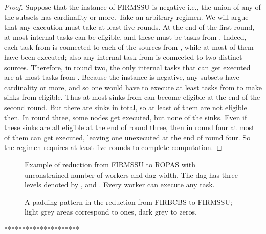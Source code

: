 \documentclass[letterpaper,11pt]{article}
\newcommand{\FFF}{\vspace*{\bigskipamount}}
\begin{document}
{\begin{proof}
Suppose that the instance of FIRMSSU is negative i.e., the union of any  of the subsets has cardinality  or more. Take an arbitrary regimen. We will argue that any execution must take at least five rounds. 
At the end of the first round, at most  internal tasks can be eligible, and these must be tasks from . Indeed, each task from  is connected to each of the  sources from , while at most  of them have been executed; also any internal task from  is connected to two distinct sources.
Therefore, in round two, the only internal tasks that can get executed are at most  tasks from . Because the instance is negative, any  subsets have cardinality  or more, and so one would have to execute at least  tasks from  to make  sinks from  eligible. Thus at most  sinks from  can become eligible at the end of the second round. But there are  sinks in total, so at least  of them are not eligible then.
In round three, some nodes get executed, but none of the  sinks. Even if these sinks are all eligible at the end of round three, then in round four at most  of them can get executed, leaving one unexecuted at the end of round four. 
So the regimen requires at least five rounds to complete computation.
\end{proof}




\FFF
\FFF
\FFF
\FFF

\begin{figure}[htb]
\centerline{}
\caption{Example of reduction from FIRMSSU to ROPAS with unconstrained number of workers and dag width. The dag has three levels denoted by ,  and . Every worker can execute any task.
\label{f.reduction}}
\end{figure}


\begin{figure}[htb]
\centerline{}
\caption{A padding pattern in the reduction from FIRBCBS to FIRMSSU; light grey areas correspond to ones, dark grey to zeros.
\label{f.padding}}
\end{figure}

*********************}
\end{document}
